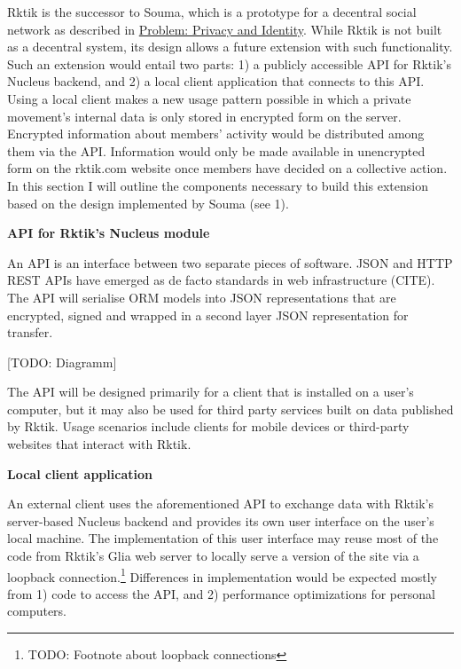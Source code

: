 
Rktik is the successor to Souma, which is a prototype for a decentral
social network as described in
\hyperref[problem-privacy-and-identity]{Problem: Privacy and Identity}.
While Rktik is not built as a decentral system, its design allows a
future extension with such functionality. Such an extension would entail
two parts: 1) a publicly accessible API for Rktik's Nucleus backend, and
2) a local client application that connects to this API. Using a local
client makes a new usage pattern possible in which a private movement's
internal data is only stored in encrypted form on the server. Encrypted
information about members' activity would be distributed among them via
the API. Information would only be made available in unencrypted form on
the rktik.com website once members have decided on a collective action.
In this section I will outline the components necessary to build this
extension based on the design implemented by Souma (see 1).

\textbf{API for Rktik's Nucleus module}

An API is an interface between two separate pieces of software. JSON and
HTTP REST APIs have emerged as de facto standards in web infrastructure
(CITE). The API will serialise ORM models into JSON representations that
are encrypted, signed and wrapped in a second layer JSON representation
for transfer.

{[}TODO: Diagramm{]}

The API will be designed primarily for a client that is installed on a
user's computer, but it may also be used for third party services built
on data published by Rktik. Usage scenarios include clients for mobile
devices or third-party websites that interact with Rktik.

\textbf{Local client application}

An external client uses the aforementioned API to exchange data with
Rktik's server-based Nucleus backend and provides its own user interface
on the user's local machine. The implementation of this user interface
may reuse most of the code from Rktik's Glia web server to locally serve
a version of the site via a loopback connection.\footnote{TODO: Footnote
  about loopback connections} Differences in implementation would be
expected mostly from 1) code to access the API, and 2) performance
optimizations for personal computers.

